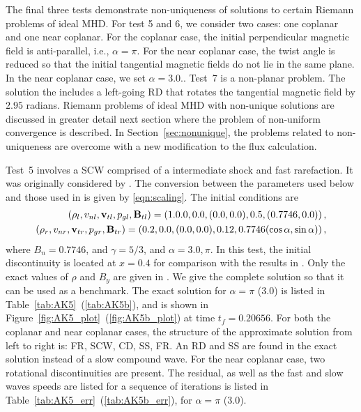 The final three tests demonstrate non-uniqueness of solutions to certain Riemann problems of ideal MHD.  For test 5 and 6, we consider two cases: one coplanar and one near coplanar.  For the coplanar case, the initial perpendicular magnetic field is anti-parallel, i.e., $\alpha = \pi$.  For the near coplanar case, the twist angle is reduced so that the initial tangential magnetic fields do not lie in the same plane.  In the near coplanar case, we set $\alpha = 3.0.$.  Test~7 is a non-planar problem.  The solution the includes a left-going RD that rotates the tangential magnetic field by $2.95$ radians.  Riemann problems of ideal MHD with non-unique solutions are discussed in greater detail next section where the problem of non-uniform convergence is described.  In Section~\ref{sec:nonunique}, the problems related to non-uniqueness are overcome with a new modification to the flux calculation.  

Test~5 involves a SCW comprised of a intermediate shock and fast rarefaction.  It was originally considered by \citet{Torrilhon:2003b}.  The conversion between the parameters used below and those used in \citep{Torrilhon:2003b} is given by \eqref{eqn:scaling}.  The initial conditions are 
\begin{gather}
\begin{split}
\label{eqn:AK5_init}
(\rho_l,v_{nl},\mathbf{v}_{tl},p_{gl},\mathbf{B}_{tl})= \left(1.0.0,0.0,(0.0,0.0),0.5,(0.7746, 0.0)\right), \\
(\rho_r,v_{nr},\mathbf{v}_{tr},p_{gr},\mathbf{B}_{tr}) = \left(0.2,0.0,(0.0,0.0),0.12,0.7746(\cos \alpha,\sin \alpha)\right),
\end{split}
\end{gather}
where $B_n = 0.7746$, and $\gamma=5/3$, and $\alpha = 3.0, \pi$.  In this test, the initial discontinuity is located at $x=0.4$ for comparison with the results in \citep{Torrilhon:2003b}.  Only the exact values of $\rho$ and $B_y$ are given in \citep{Torrilhon:2003b}.  We give the complete solution so that it can be used as a benchmark.  The exact solution for $\alpha = \pi$ ($3.0$) is listed in Table~\ref{tab:AK5}~(\ref{tab:AK5b}), and is shown in Figure~\ref{fig:AK5_plot}~(\ref{fig:AK5b_plot}) at time $t_f=0.20656$.  For both the coplanar and near coplanar cases, the structure of the approximate solution from left to right is: FR, SCW, CD, SS, FR.  An RD and SS are found in the exact solution instead of a slow compound wave.  For the near coplanar case, two rotational discontinuities are present.  The residual, as well as the fast and slow waves speeds are listed for a sequence of iterations is listed in Table~\ref{tab:AK5_err}~(\ref{tab:AK5b_err}), for $\alpha = \pi$ ($3.0$).  


